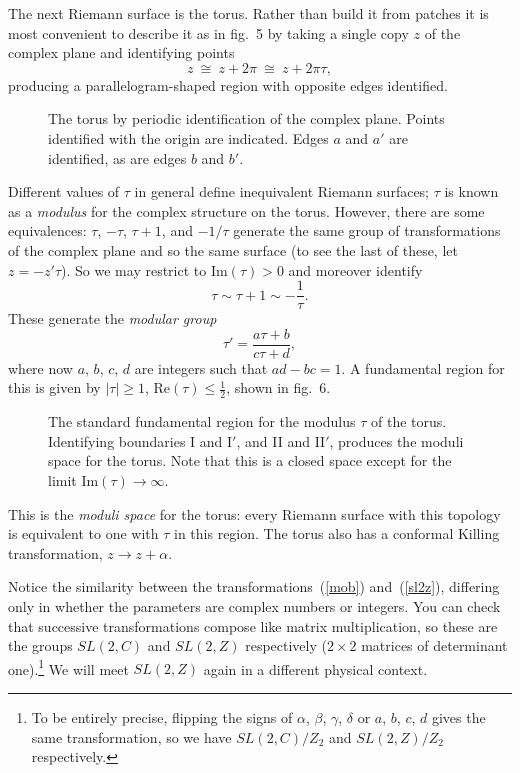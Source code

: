 The next Riemann surface is the torus.  Rather than build it from
patches it is most convenient to describe it as in fig.~5 by
taking a single copy $z$ of the complex plane and identifying points
\begin{equation}
z \ \cong\ z+2\pi \ \cong\ z+2\pi \tau,
\end{equation}
producing a parallelogram-shaped region with opposite edges
identified.
\begin{figure}
\begin{center}
\leavevmode
{}
\end{center}
\caption[]{The torus by periodic identification of the complex
plane.  Points identified with the origin are indicated.
Edges $a$ and $a'$ are identified, as are edges $b$ and
$b'$.}
\end{figure}
Different values of $\tau$ in general define
inequivalent Riemann surfaces; $\tau$ is known as a {\it modulus}
for the complex structure on the torus.  However, there are some
equivalences: $\tau$, $-\tau$, $\tau+1$, and $-1/\tau$ generate the
same group of transformations of the complex plane and so the same
surface (to see the last of these, let $z = - z'\tau$).
So we may restrict to Im$(\tau) > 0$ and moreover identify
\begin{equation}
\tau \sim \tau+1 \sim -\frac{1}{\tau}. \label{tauid}
\end{equation}
These generate the {\it modular group}
\begin{equation}
\tau' = \frac{a \tau + b}{c \tau + d}, \label{sl2z}
\end{equation}
where now $a$, $b$, $c$, $d$ are integers such that $ad-bc= 1$.
A fundamental region for this is given by $|\tau|\geq 1$,
Re$(\tau) \leq \frac{1}{2}$, shown in fig.~6.
\begin{figure}
\begin{center}
\leavevmode
{}
\end{center}
\caption[]{The standard fundamental region for the modulus
$\tau$ of the torus.  Identifying boundaries I and I$'$, and II and
II$'$, produces the moduli space for the torus.  Note that this is a
closed space except for the limit Im$(\tau) \to \infty$.}
\end{figure}
This is the 
{\it moduli space}
for the torus: every Riemann surface with this topology is equivalent
to one with $\tau$ in this region.  The torus also has
a conformal Killing transformation, $z \to z+\alpha$.

Notice the similarity between the transformations~(\ref{mob})
and~(\ref{sl2z}), differing only in whether the parameters are
complex numbers or integers.  You can check that successive
transformations compose like matrix multiplication, so these
are the groups $SL(2,C)$ and $SL(2,Z)$ respectively ($2\times 2$
matrices of determinant one).\footnote
{To be entirely precise, flipping the signs of
$\alpha$, $\beta$, $\gamma$, $\delta$ or
$a$, $b$, $c$, $d$ gives the same transformation, so we have
$SL(2,C)/Z_2$ and $SL(2,Z)/Z_2$ respectively.}
We will meet $SL(2,Z)$ again in a
different physical context.

